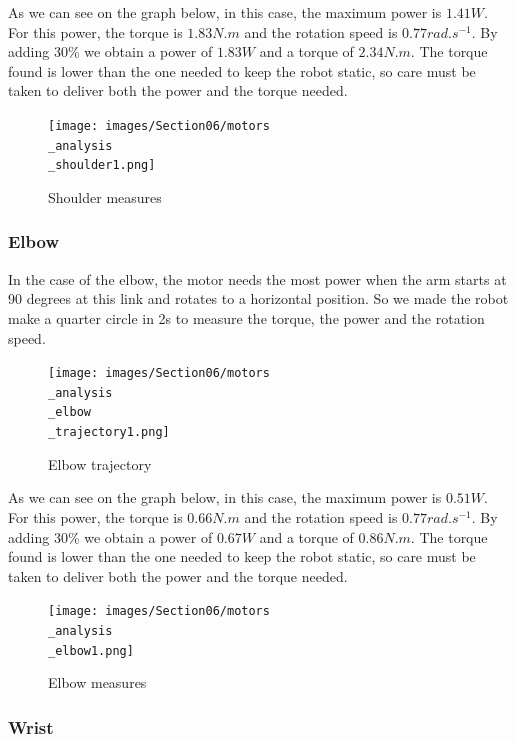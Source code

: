 \bigbreak
As we can see on the graph below, in this case, the maximum power is $1.41W$. For this power, the torque is $1.83N.m$ and the rotation speed is $0.77rad.s^{-1}$. By adding 30\% we obtain a power of $1.83W$ and a torque of $2.34N.m$. The torque found is lower than the one needed to keep the robot static, so care must be taken to deliver both the power and the torque needed.
\begin{figure}[ht]
    \centering
    \texttt{[image: images/Section06/motors\\\_analysis\\\_shoulder1.png]}
    \caption{Shoulder measures}
    \label{fig:mesh15}
\end{figure}
\FloatBarrier

\subsubsection{Elbow}

In the case of the elbow, the motor needs the most power when the arm starts at 90 degrees at this link and rotates to a horizontal position. So we made the robot make a quarter circle in 2s to measure the torque, the power and the rotation speed.

\begin{figure}[ht]
    \centering
    \texttt{[image: images/Section06/motors\\\_analysis\\\_elbow\\\_trajectory1.png]}
    \caption{Elbow trajectory}
    \label{fig:mesh15}
\end{figure}
\FloatBarrier

As we can see on the graph below, in this case, the maximum power is $0.51W$. For this power, the torque is $0.66N.m$ and the rotation speed is $0.77rad.s^{-1}$. By adding 30\% we obtain a power of $0.67W$ and a torque of $0.86N.m$. The torque found is lower than the one needed to keep the robot static, so care must be taken to deliver both the power and the torque needed.
\begin{figure}[ht]
    \centering
    \texttt{[image: images/Section06/motors\\\_analysis\\\_elbow1.png]}
    \caption{Elbow measures}
    \label{fig:mesh15}
\end{figure}
\FloatBarrier

\subsubsection{Wrist}

